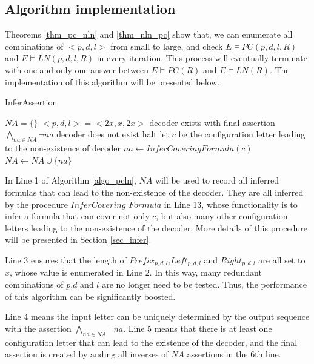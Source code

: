 \documentclass{sig-alternate}
\begin{document}
\subsection{Algorithm implementation}\label{subsec_algo}
Theorems \ref{thm_pc_nln} and \ref{thm_nln_pc} show that,
we can enumerate all combinations of $<p,d,l>$ from small to large,
and check $E\vDash PC(p,d,l,R)$ and $E\vDash LN(p,d,l,R)$ in every iteration.
This process will eventually terminate with one and only one answer between $E\vDash PC(R)$ and $E\vDash LN(R)$.
The implementation of this algorithm will be presented below.

\begin{algorithm}
\caption{InferAssertion}
\label{algo_pcln}
\begin{algorithmic}[1]
\STATE $NA=\{\}$
\STATE $<p,d,l>=<2x,x,2x>$
\STATE decoder exists with final assertion $\bigwedge_{na\in NA}\neg na$
\ELSE
\STATE decoder does not exist
\ENDIF
\STATE halt
\STATE let $c$ be the configuration letter leading to the non-existence of decoder
\STATE $na\leftarrow InferCoveringFormula(c)$
\STATE $NA\leftarrow NA\cup \{na\}$
\ENDIF
\ENDFOR
\end{algorithmic}
\end{algorithm}

In Line 1 of Algorithm \ref{algo_pcln},
$NA$ will be used to record all inferred formulas that can lead to the non-existence of the decoder.
They are all inferred by the procedure $InferCovering$ $Formula$ in Line 13,
whose functionality is to infer a formula that can cover not only $c$,
but also many other configuration letters leading to the non-existence of the decoder.
More details of this procedure will be presented in Section \ref{sec_infer}.

Line 3 ensures that the length of $Prefix_{p,d,l}$,$Left_{p,d,l}$ and $Right_{p,d,l}$ are all set to $x$,
whose value is enumerated in Line 2.
In this way,
many redundant combinations of $p$,$d$ and $l$ are no longer need to be tested.
Thus, the performance of this algorithm can be significantly boosted.

Line 4 means the input letter can be uniquely determined by the output sequence with the assertion $\bigwedge_{na\in NA}\neg na$.
Line 5 means that there is at least one configuration letter that can lead to the existence of the decoder,
and the final assertion is created by anding all inverses of $NA$ assertions in the 6th line.
\end{document}
